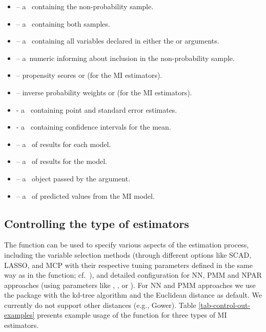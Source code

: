 \documentclass[
]{jss}
\begin{document}
\begin{itemize}
\item {} -- a~ containing the non-probability sample.
\item {} -- a~ containing both samples.
\item {} -- a~ containing all variables declared in either the  or  arguments.
\item {} -- a~numeric  informing about inclusion in the non-probability sample.
\item {} -- propensity scores or  (for the MI estimators).
\item {} -- inverse probability weights or  (for the MI estimators).
\item {} - a~ containing point and standard error estimates.
\item {} - a~ containing confidence intervals for the mean.
\item {} -- a~ of results for each  model.
\item {} -- a~ of results for the  model.
\item {} -- a~ object passed by the  argument.
\item {} -- a~ of predicted values from the MI model.
\end{itemize}

\subsection{Controlling the type of
estimators}\label{controlling-the-type-of-estimators}

The  function can be used to specify various aspects
of the estimation process, including the variable selection methods
(through different  options like SCAD, LASSO, and MCP with
their respective tuning parameters defined in the same way as in the
 function; cf.~\citet{yang_doubly_2020}), and
detailed configuration for NN, PMM and NPAR approaches (using parameters
like , ,  or
). For NN and PMM approaches we use the 
package \citep{rann-pkg} with the kd-tree algorithm and the Euclidean
distance as default. We currently do not support other distances (e.g.,
Gower). Table \ref{tab-control-out-examples} presents example usage of
the  function for three types of MI estimators.
\end{document}

